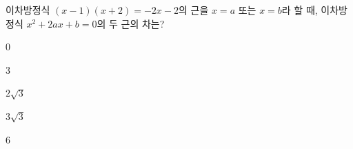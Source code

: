 이차방정식 $(x-1)(x+2)=-2x-2$의 근을 $x=a$ 또는 $x=b$라 할 때, 이차방정식 $x^2+2ax+b=0$의 두 근의 차는? 
\begin{choices32}{\rule[-3ex]{0pt}{8ex}$0$}{\rule[-3ex]{0pt}{8ex}$3$}{\rule[-3ex]{0pt}{8ex}$2\sqrt{3}$}{\rule[-3ex]{0pt}{8ex}$3\sqrt{3}$}{\rule[-3ex]{0pt}{8ex}$6$}\end{choices32}
